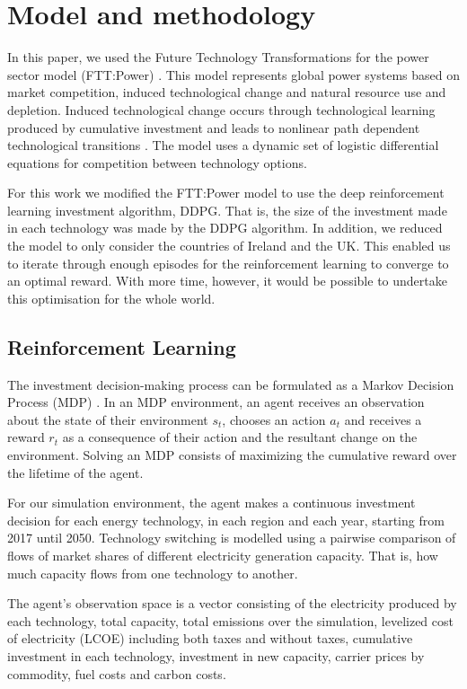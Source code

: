 \documentclass{article}
\begin{document}
\section{Model and methodology}
\label{sec:methods}


In this paper, we used the Future Technology Transformations for the power sector model (FTT:Power) \cite{Mercure2012}. This model represents global power systems based on market competition, induced technological change and natural resource use and depletion. Induced technological change occurs through technological learning produced by cumulative investment and leads to nonlinear path dependent technological transitions \cite{Mercure2012}. The model uses a dynamic set of logistic differential equations for competition between technology options.

For this work we modified the FTT:Power model to use the deep reinforcement learning investment algorithm, DDPG. That is, the size of the investment made in each technology was made by the DDPG algorithm. In addition, we reduced the model to only consider the countries of Ireland and the UK. This enabled us to iterate through enough episodes for the reinforcement learning to converge to an optimal reward. With more time, however, it would be possible to undertake this optimisation for the whole world.

\subsection*{Reinforcement Learning}

The investment decision-making process can be formulated as a Markov Decision Process (MDP) \cite{puterman2014markov}. In an MDP environment, an agent receives an observation about the state of their environment $s_t$, chooses an action $a_t$ and receives a reward $r_t$ as a consequence of their action and the resultant change on the environment. Solving an MDP consists of maximizing the cumulative reward over the lifetime of the agent. 


For our simulation environment, the agent makes a continuous investment decision for each energy technology, in each region and each year, starting from 2017 until 2050. 	Technology switching is modelled using a pairwise comparison of flows of market shares of different electricity generation capacity. That is, how much capacity flows from one technology to another. 

The agent's observation space is a vector consisting of the electricity produced by each technology, total capacity, total  emissions over the simulation, levelized cost of electricity (LCOE) including both taxes and without taxes, cumulative investment in each technology, investment in new capacity, carrier prices by commodity, fuel costs and carbon costs.
\end{document}
